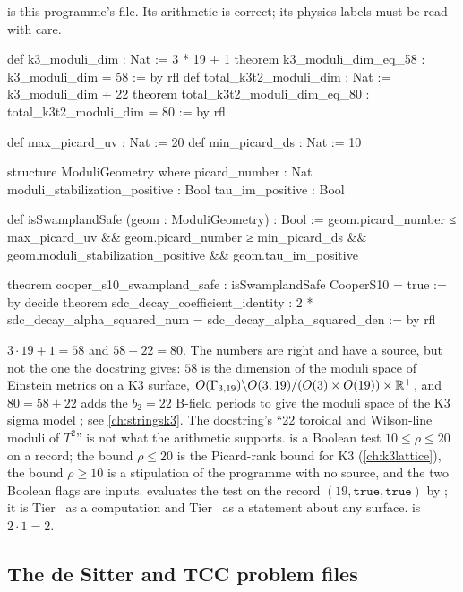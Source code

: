  is this programme's file.
Its arithmetic is correct; its physics labels must be read with care.
\begin{leancode}
def k3_moduli_dim : Nat := 3 * 19 + 1
theorem k3_moduli_dim_eq_58 : k3_moduli_dim = 58 := by rfl
def total_k3t2_moduli_dim : Nat := k3_moduli_dim + 22
theorem total_k3t2_moduli_dim_eq_80 : total_k3t2_moduli_dim = 80 := by rfl

def max_picard_uv : Nat := 20
def min_picard_ds : Nat := 10

structure ModuliGeometry where
  picard_number : Nat
  moduli_stabilization_positive : Bool
  tau_im_positive : Bool

def isSwamplandSafe (geom : ModuliGeometry) : Bool :=
  geom.picard_number ≤ max_picard_uv &&
  geom.picard_number ≥ min_picard_ds &&
  geom.moduli_stabilization_positive &&
  geom.tau_im_positive

theorem cooper_s10_swampland_safe : isSwamplandSafe CooperS10 = true := by decide
theorem sdc_decay_coefficient_identity :
    2 * sdc_decay_alpha_squared_num = sdc_decay_alpha_squared_den := by rfl
\end{leancode}

\begin{leanbox}
$3\cdot19+1=58$ and $58+22=80$. The numbers are right and have a source, but not the one the
docstring gives: $58$ is the dimension of the moduli space of Einstein metrics on a K3 surface,
$O(\Gamma_{3,19})\backslash O(3,19)/(O(3)\times O(19))\times\mathbb{R}^+$, and $80=58+22$ adds the
$b_2=22$ B-field periods to give the moduli space of the K3 sigma model
; see \cref{ch:stringsk3}. The docstring's
``22 toroidal and Wilson-line moduli of $T^2$'' is not what the arithmetic supports.
 is a Boolean test $10\le\rho\le20$ on a record; the bound $\rho\le20$ is
the Picard-rank bound for K3 (\cref{ch:k3lattice}), the bound $\rho\ge10$ is a stipulation of the
programme with no source, and the two Boolean flags are inputs. 
evaluates the test on the record $(19,\mathtt{true},\mathtt{true})$ by ; it is
Tier~\TA{} as a computation and Tier~\TC{} as a statement about any surface.
 is $2\cdot1=2$.
\end{leanbox}

\subsection{The de Sitter and TCC problem files}


